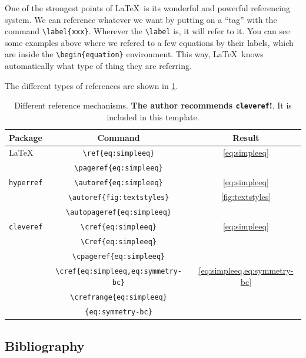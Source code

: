 One of the strongest points of \LaTeX\ is its wonderful and powerful referencing system. We can reference whatever we want by putting on a ``tag'' with the command \verb|\label{xxx}|. Wherever the \verb|\label| is, it will refer to it. You can see some examples above where we refered to a few equations by their labels, which are inside the \verb|\begin{equation}| environment. This way, \LaTeX\ knows automatically what type of thing they are referring.

The different types of references are shown in \cref{tab:reference-systems}.

\begin{table}[h]
	\centering
	\begin{tabular}{lcc}
	  \toprule
	  Package & Command & Result \\
	  \midrule
	  \LaTeX & \verb|\ref{eq:simpleeq}| & \ref{eq:simpleeq} \\
	  & \verb|\pageref{eq:simpleeq}| & \pageref{eq:simpleeq} \\
	  \cmidrule{2-3}
	  \texttt{hyperref} & \verb|\autoref{eq:simpleeq}| & \autoref{eq:simpleeq} \\
			  & \verb|\autoref{fig:textstyles}| & \autoref{fig:textstyles} \\
			  & \verb|\autopageref{eq:simpleeq}| & \autopageref{eq:simpleeq} \\
	  \cmidrule{2-3}
	  \texttt{cleveref} & \verb|\cref{eq:simpleeq}| & \cref{eq:simpleeq} \\
			  & \verb|\Cref{eq:simpleeq}| & \Cref{eq:simpleeq} \\
	  & \verb|\cpageref{eq:simpleeq}| & \cpageref{eq:simpleeq} \\
			  & \verb|\cref{eq:simpleeq,eq:symmetry-bc}| & \cref{eq:simpleeq,eq:symmetry-bc} \\
			  & \verb|\crefrange{eq:simpleeq}| & \multirow{2}{*}{\crefrange{eq:simpleeq}{eq:symmetry-bc}}\\
	  & \verb|{eq:symmetry-bc}| & \\
	  \bottomrule
	\end{tabular}
	\caption[Different reference mechanisms.]{Different reference mechanisms. \textbf{The author recommends \texttt{cleveref}!}. It is included in this template.}
	\label{tab:reference-systems}
\end{table}

\subsection{Bibliography}

